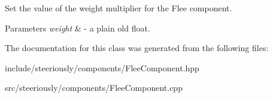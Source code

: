 Set the value of the weight multiplier for the Flee component. 


\begin{DoxyParams}{Parameters}
{\em weight} & -\/ a plain old float. \\
\hline
\end{DoxyParams}


The documentation for this class was generated from the following files\-:\begin{DoxyCompactItemize}
\item 
include/steeriously/components/Flee\-Component.\-hpp\item 
src/steeriously/components/Flee\-Component.\-cpp\end{DoxyCompactItemize}
